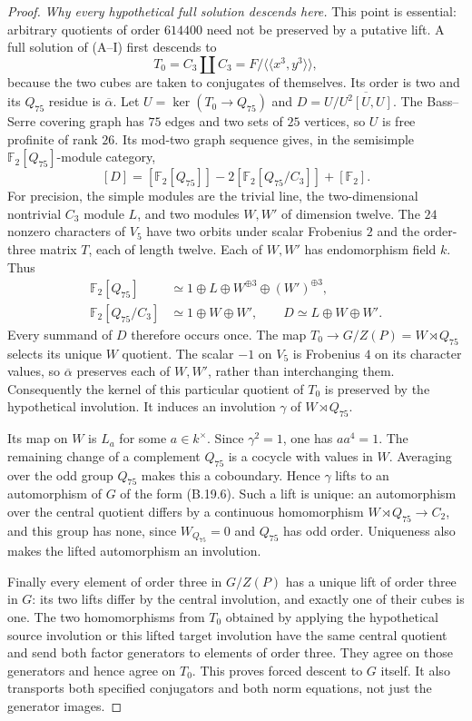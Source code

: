 \begin{proof}
\emph{Why every hypothetical full solution descends here.}
This point is essential: arbitrary quotients of order $614400$
need not be preserved by a putative lift. A full solution of
(A--I) first descends to
\[
       T_0=C_3\amalg C_3
          =F/\langle\!\langle x^3,y^3\rangle\!\rangle,
\]
because the two cubes are taken to conjugates of themselves.
Its order is two and its $Q_{75}$ residue is
$\overline\alpha$. Let $U=\ker(T_0\to Q_{75})$ and
$D=U/\overline{U^2[U,U]}$.
The Bass--Serre covering graph has $75$ edges and two sets of
$25$ vertices, so $U$ is free profinite of rank $26$.
Its mod-two graph sequence gives, in the semisimple
$\mathbb F_2[Q_{75}]$-module category,
\[
 [D]=[\mathbb F_2[Q_{75}]]
     -2[\mathbb F_2[Q_{75}/C_3]]+[\mathbb F_2].
 \tag{B.19.8}
\]
For precision, the simple modules are the trivial line, the
two-dimensional nontrivial $C_3$ module $L$, and two modules
$W,W'$ of dimension twelve. The $24$ nonzero characters of
$V_5$ have two orbits under scalar Frobenius $2$ and the
order-three matrix $T$, each of length twelve. Each of $W,W'$
has endomorphism field $k$. Thus
\[
\begin{split}
 \mathbb F_2[Q_{75}]&\simeq1\oplus L\oplus W^{\oplus3}
                                         \oplus(W')^{\oplus3},\\
 \mathbb F_2[Q_{75}/C_3]&\simeq1\oplus W\oplus W',\qquad
 D\simeq L\oplus W\oplus W'.
\end{split}
\]
Every summand of $D$ therefore occurs once. The map
$T_0\to G/Z(P)=W\rtimes Q_{75}$ selects its unique $W$
quotient. The scalar $-1$ on $V_5$ is Frobenius $4$ on
its character values, so $\overline\alpha$ preserves each of
$W,W'$, rather than interchanging them. Consequently the kernel
of this particular quotient of $T_0$ is preserved by the
hypothetical involution. It induces an involution
$\gamma$ of $W\rtimes Q_{75}$.

Its map on $W$ is $L_a$ for some $a\in k^\times$.
Since $\gamma^2=1$, one has $aa^4=1$.
The remaining change of a complement $Q_{75}$ is a cocycle with
values in $W$. Averaging over the odd group $Q_{75}$ makes this
a coboundary. Hence $\gamma$ lifts to an automorphism of $G$
of the form (B.19.6). Such a lift is unique:
an automorphism over the central quotient differs by a continuous
homomorphism $W\rtimes Q_{75}\to C_2$, and this group has none,
since $W_{Q_{75}}=0$ and $Q_{75}$ has odd order. Uniqueness also
makes the lifted automorphism an involution.

Finally every element of order three in $G/Z(P)$ has a unique
lift of order three in $G$: its two lifts differ by the central
involution, and exactly one of their cubes is one.
The two homomorphisms from $T_0$ obtained by applying the
hypothetical source involution or this lifted target involution
have the same central quotient and send both factor generators
to elements of order three. They agree on those generators and
hence agree on $T_0$. This proves forced descent to $G$ itself.
It also transports both specified conjugators and both norm
equations, not just the generator images.


\end{proof}
